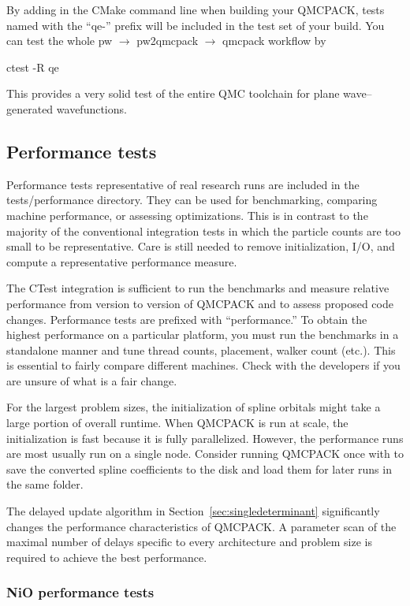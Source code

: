 By adding  in the CMake command line when building your QMCPACK,
tests named with the ``qe-'' prefix will be included in the test set of your build.
You can test the whole pw $\to$ pw2qmcpack $\to$ qmcpack workflow by

\begin{shade}
ctest -R qe
\end{shade}
This provides a very solid test of the entire QMC
toolchain for plane wave--generated wavefunctions.

\subsection{Performance tests}
\label{sec:perftests}
Performance tests representative of real research runs are included in the
tests/performance directory. They can be used for benchmarking, comparing machine
performance, or assessing optimizations. This is in
contrast to the majority of the conventional integration tests in which the particle
counts are too small to be representative. Care is still needed to
remove initialization, I/O, and compute a representative performance
measure.

The CTest integration is sufficient to run the benchmarks and measure
relative performance from version to version of QMCPACK and to assess
proposed code changes. Performance tests are prefixed with
``performance.'' To obtain the highest performance on a particular
platform, you must run the benchmarks in a standalone manner and tune
thread counts, placement, walker count (etc.). This is essential to
fairly compare different machines. Check with the
developers if you are unsure of what is a fair change.

For the largest problem sizes, the initialization of spline orbitals might
take a large portion of overall runtime. When QMCPACK is run at scale,
the initialization is fast because it is fully
parallelized. However, the performance runs are most usually run on a single node.
Consider running QMCPACK once with  to save the
converted spline coefficients to the disk and load them for later runs in the same folder.

The delayed update algorithm in Section~\ref{sec:singledeterminant}
significantly changes the performance characteristics of QMCPACK.  A
parameter scan of the maximal number of delays specific to every
architecture and problem size is required to achieve the best
performance.

\subsubsection{NiO performance tests}

